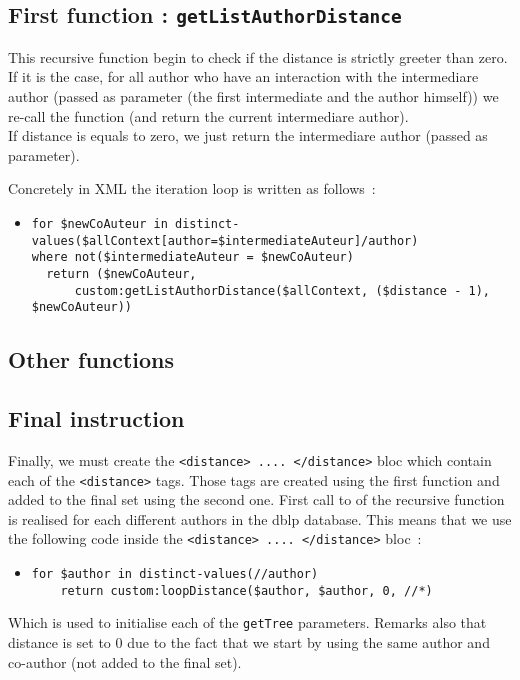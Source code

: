 \documentclass{article}
\begin{document}
  \subsection{First function : \texttt{getListAuthorDistance}}
    This recursive function begin to check if the distance is strictly greeter than zero.  If it is the case, for all author who have an interaction with the intermediare author (passed as parameter (the first intermediate and the author himself)) we re-call the function (and return the current intermediare author).\\
    If distance is equals to zero, we just return the intermediare author (passed as parameter).
  
    Concretely in XML the iteration loop is written as follows~:
    \begin{itemize}
      \item \begin{verbatim}
for $newCoAuteur in distinct-values($allContext[author=$intermediateAuteur]/author)
where not($intermediateAuteur = $newCoAuteur)
  return ($newCoAuteur, 
      custom:getListAuthorDistance($allContext, ($distance - 1), $newCoAuteur))\end{verbatim}
    \end{itemize}
    
  \subsection{Other functions}
    
  
  \subsection{Final instruction}
    Finally, we must create the \verb|<distance> .... </distance>| bloc which contain each of the \verb|<distance>| tags. Those tags are created using the first function and added to the final set using the second one. First call to of the recursive function is realised for each different authors in the dblp database. This means that we use the following code inside the \verb|<distance> .... </distance>| bloc~:
    \begin{itemize}
      \item \begin{verbatim}
for $author in distinct-values(//author)
    return custom:loopDistance($author, $author, 0, //*)\end{verbatim}
    \end{itemize}
    Which is used to initialise each of the \verb|getTree| parameters. Remarks also that distance is set to 0 due to the fact that we start by using the same author and co-author (not added to the final set).
\end{document}
